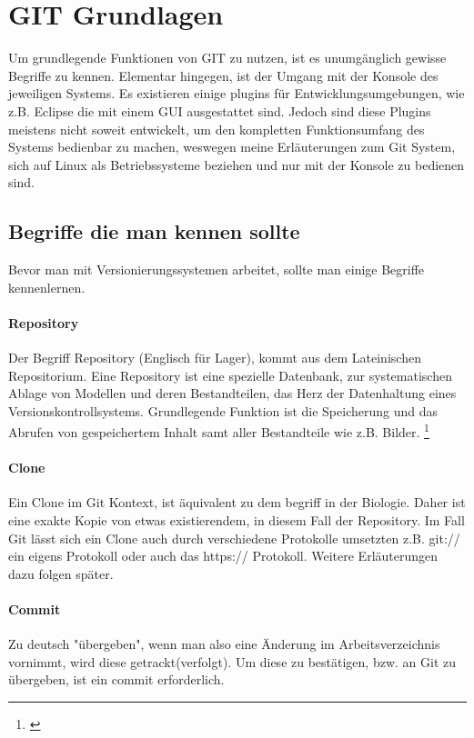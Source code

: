 \documentclass[12pt,a4paper,bibliography=totocnumbered,listof=totocnumbered]{scrartcl}
\begin{document}
\section{GIT Grundlagen}
Um grundlegende Funktionen von GIT zu nutzen, ist es unumgänglich gewisse Begriffe zu kennen. Elementar hingegen, ist der Umgang mit der Konsole des jeweiligen Systems. Es existieren einige plugins für Entwicklungsumgebungen, wie z.B. Eclipse die mit einem GUI ausgestattet sind. Jedoch sind diese Plugins meistens nicht soweit entwickelt, um den kompletten Funktionsumfang des Systems bedienbar zu machen,
weswegen meine Erläuterungen zum Git System, sich auf Linux als Betriebssysteme beziehen und nur mit der Konsole zu bedienen sind.     

\subsection{Begriffe die man kennen sollte}
Bevor man mit Versionierungssystemen arbeitet, sollte man einige Begriffe kennenlernen. 
\paragraph{Repository}
Der Begriff Repository (Englisch für Lager), kommt aus dem Lateinischen Repositorium.
Eine Repository ist eine spezielle Datenbank, zur systematischen Ablage von Modellen und deren Bestandteilen, das Herz der Datenhaltung eines Versionskontrollsystems. Grundlegende Funktion ist die Speicherung und das Abrufen von gespeichertem Inhalt samt aller Bestandteile wie z.B. Bilder. \footnote{\cite{Leymann}} 

\paragraph{Clone}
Ein Clone im Git Kontext, ist äquivalent zu dem begriff in der Biologie. Daher ist eine exakte Kopie von etwas existierendem, in diesem Fall der Repository. Im Fall Git lässt sich ein Clone auch durch verschiedene Protokolle umsetzten z.B. git:// ein eigens Protokoll oder auch das https:// Protokoll. Weitere Erläuterungen dazu folgen später. 
\paragraph{Commit}
Zu deutsch "übergeben", wenn man also eine Änderung im Arbeitsverzeichnis vornimmt, wird diese getrackt(verfolgt). Um diese zu bestätigen, bzw. an Git zu übergeben, ist ein commit erforderlich. 
\end{document}
